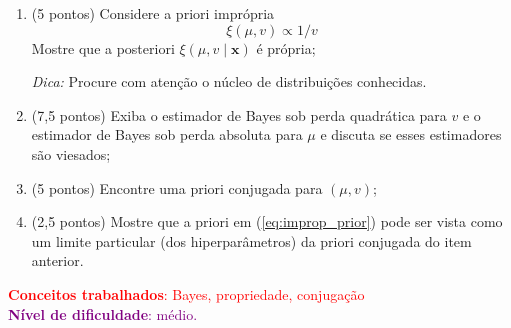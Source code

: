 \documentclass[a4paper,10pt, notitlepage]{report}
\begin{document}
\begin{enumerate}[label=\alph*)]
 \item (5 pontos) Considere a priori imprópria
 \begin{equation}
 \label{eq:improp_prior}
 \xi(\mu, v) \propto 1/v
 \end{equation}
 Mostre que a posteriori $\xi(\mu, v \mid \boldsymbol{x})$ é própria;
 
 \textit{Dica:} Procure com atenção o núcleo de distribuições conhecidas.
 \item (7,5 pontos) Exiba o estimador de Bayes sob perda quadrática para $v$ e o estimador de Bayes sob perda absoluta para $\mu$ e discuta se esses estimadores são viesados;
 \item (5 pontos) Encontre uma priori  conjugada para $(\mu, v)$;
 \item (2,5 pontos) Mostre que a priori em (\ref{eq:improp_prior}) pode ser vista como um limite particular (dos hiperparâmetros) da priori conjugada do item anterior.
\end{enumerate}
\textcolor{red}{\textbf{Conceitos trabalhados}: Bayes, propriedade, conjugação}
\\
\textcolor{purple}{\textbf{Nível de dificuldade}: médio.}
\end{document}
